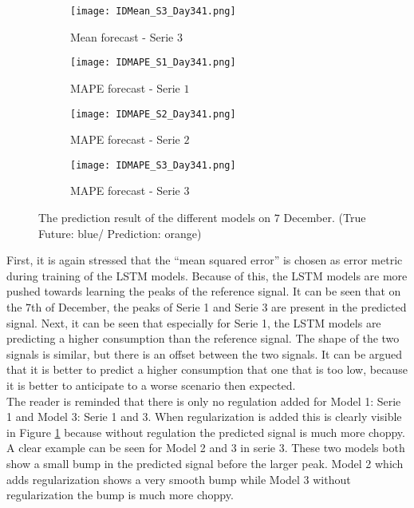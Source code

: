 \begin{figure}[ht]
	\begin{subfigure}{0.32\textwidth}
		\texttt{[image: IDMean\_S3\_Day341.png]}
		\caption{Mean forecast - Serie $ 3 $}
	\end{subfigure}
	 \begin{subfigure}{0.32\textwidth}
		\texttt{[image: IDMAPE\_S1\_Day341.png]}
		\caption{MAPE forecast - Serie $ 1 $}
	\end{subfigure}	 	
	\begin{subfigure}{0.32\textwidth}
		\texttt{[image: IDMAPE\_S2\_Day341.png]}
		\caption{MAPE forecast - Serie $ 2 $}
	\end{subfigure}	
	\begin{subfigure}{0.32\textwidth}
		\texttt{[image: IDMAPE\_S3\_Day341.png]}
		\caption{MAPE forecast - Serie $ 3 $}
	\end{subfigure}
 	\caption{The prediction result of the different models on $ 7 $ December. (True Future: blue/ Prediction: orange)}
 	\label{fig:individual_forecasts}
 \end{figure}


First, it is again stressed that the ``mean squared error'' is chosen as error metric during training of the LSTM models. Because of this, the LSTM models are more pushed towards learning the peaks of the reference signal. It can be seen that on the $ 7 $th of December, the peaks of Serie 1 and Serie 3 are present in the predicted signal. Next, it can be seen that especially for Serie 1, the LSTM models are predicting a higher consumption than the reference signal. The shape of the two signals is similar, but there is an offset between the two signals. It can be argued that it is better to predict a higher consumption that one that is too low, because it is better to anticipate to a worse scenario then expected.\\

The reader is reminded that there is only no regulation added for Model 1: Serie 1 and Model 3: Serie 1 and 3. When regularization is added this is clearly visible in Figure \ref{fig:individual_forecasts} because without regulation the predicted signal is much more choppy. A clear example can be seen for Model 2 and 3 in serie 3. These two models both show a small bump in the predicted signal before the larger peak. Model 2 which adds regularization shows a very smooth bump while Model 3 without regularization the bump is much more choppy. \\

